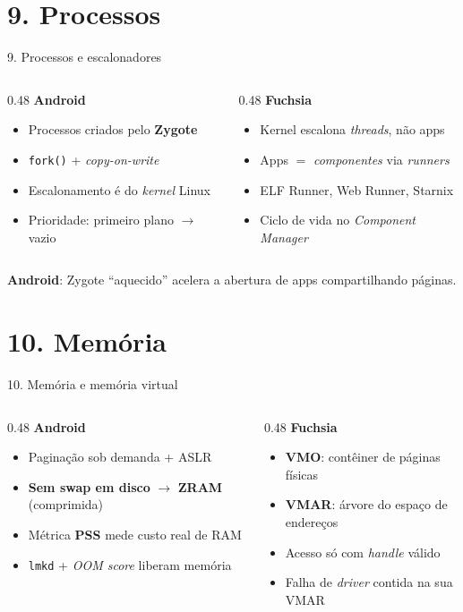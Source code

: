 \documentclass[aspectratio=169,11pt]{beamer}
\newcommand{\ANDROID}{\textbf{\color{androidVerde}Android}}
\newcommand{\FUCHSIA}{\textbf{\color{fuchsiaCor}Fuchsia}}
\newcommand{\comparar}[2]{%
  \begin{columns}[T,onlytextwidth]
    \begin{column}{0.48\textwidth}
      \ANDROID\par\smallskip
      \begin{itemize}\footnotesize #1 \end{itemize}
    \end{column}
    \begin{column}{0.48\textwidth}
      \FUCHSIA\par\smallskip
      \begin{itemize}\footnotesize #2 \end{itemize}
    \end{column}
  \end{columns}%
}
\begin{document}
\section{9. Processos}

\begin{frame}{9. Processos e escalonadores}
  \comparar{
    \item Processos criados pelo \textbf{Zygote}
    \item \texttt{fork()} + \emph{copy-on-write}
    \item Escalonamento é do \emph{kernel} Linux
    \item Prioridade: primeiro plano $\rightarrow$ vazio
  }{
    \item Kernel escalona \emph{threads}, não apps
    \item Apps $=$ \emph{componentes} via \emph{runners}
    \item ELF Runner, Web Runner, Starnix
    \item Ciclo de vida no \emph{Component Manager}
  }
  \vfill
  \begin{center}\footnotesize
    \ANDROID: Zygote ``aquecido'' acelera a abertura de apps compartilhando páginas.
  \end{center}
\end{frame}

\section{10. Memória}

\begin{frame}{10. Memória e memória virtual}
  \comparar{
    \item Paginação sob demanda + ASLR
    \item \textbf{Sem swap em disco} $\rightarrow$ \textbf{ZRAM} (comprimida)
    \item Métrica \textbf{PSS} mede custo real de RAM
    \item \texttt{lmkd} + \emph{OOM score} liberam memória
  }{
    \item \textbf{VMO}: contêiner de páginas físicas
    \item \textbf{VMAR}: árvore do espaço de endereços
    \item Acesso só com \emph{handle} válido
    \item Falha de \emph{driver} contida na sua VMAR
  }
\end{frame}
\end{document}
